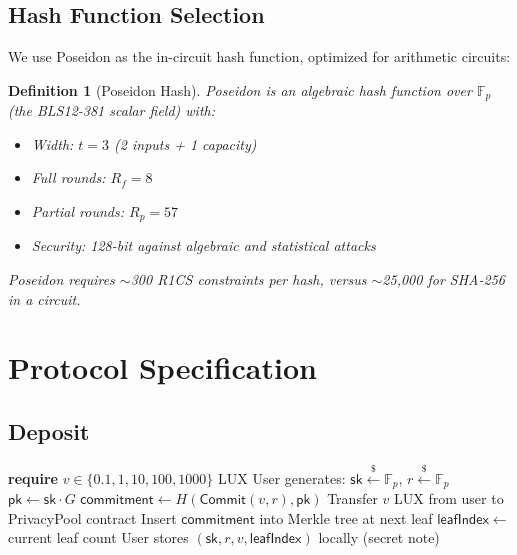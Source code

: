 \documentclass[11pt,a4paper]{article}
\newtheorem{definition}{Definition}
\begin{document}
\subsection{Hash Function Selection}

We use Poseidon \cite{grassi2021poseidon} as the in-circuit hash function, optimized for arithmetic circuits:

\begin{definition}[Poseidon Hash]
Poseidon is an algebraic hash function over $\mathbb{F}_p$ (the BLS12-381 scalar field) with:
\begin{itemize}
    \item Width: $t = 3$ (2 inputs + 1 capacity)
    \item Full rounds: $R_f = 8$
    \item Partial rounds: $R_p = 57$
    \item Security: 128-bit against algebraic and statistical attacks
\end{itemize}
Poseidon requires $\sim$300 R1CS constraints per hash, versus $\sim$25,000 for SHA-256 in a circuit.
\end{definition}

\section{Protocol Specification}\label{sec:protocol}

\subsection{Deposit}

\begin{algorithm}[H]
\caption{Privacy Pool Deposit}
\label{alg:deposit}
\begin{algorithmic}[1]
    \State \textbf{require} $v \in \{0.1, 1, 10, 100, 1000\}$ LUX 
    \State User generates: $\mathsf{sk} \xleftarrow{\$} \mathbb{F}_p$, $r \xleftarrow{\$} \mathbb{F}_p$
    \State $\mathsf{pk} \gets \mathsf{sk} \cdot G$
    \State $\mathsf{commitment} \gets H(\mathsf{Commit}(v, r), \mathsf{pk})$
    \State Transfer $v$ LUX from user to PrivacyPool contract
    \State Insert $\mathsf{commitment}$ into Merkle tree at next leaf
    \State $\mathsf{leafIndex} \gets$ current leaf count
    \State User stores $(\mathsf{sk}, r, v, \mathsf{leafIndex})$ locally (secret note)
\EndProcedure
\end{algorithmic}
\end{algorithm}
\end{document}
